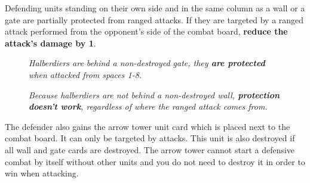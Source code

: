 Defending units standing on their own side and in the same column as a wall or a gate are partially protected from ranged attacks.
If they are targeted by a ranged attack performed from the opponent's side of the combat board, \textbf{reduce the attack's damage by 1}.
\begin{figure}[h]
  \begin{minipage}[t]{0.48\textwidth}
    \centering
  \caption[halberdiers protected]{\textit{Halberdiers are behind a non-destroyed gate, they \textbf{are protected} when attacked from spaces 1-8.}}
  \end{minipage}\hfill
  \begin{minipage}[t]{0.48\textwidth}
    \centering
  \caption[halberdiers unprotected]{\textit{Because halberdiers are not behind a non-destroyed wall, \textbf{protection doesn't work}, regardless of where the ranged attack comes from.}}
  \end{minipage}
\end{figure}

The defender also gains the arrow tower unit card which is placed next to the combat board.
It can only be targeted by  attacks.
This unit is also destroyed if all wall and gate cards are destroyed.
The arrow tower cannot start a defensive combat by itself without other units and you do not need to destroy it in order to win when attacking.

\clearpage

